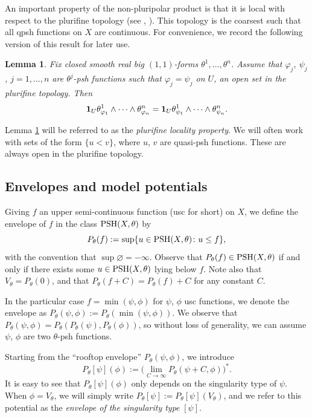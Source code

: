 \documentclass[11pt]{article}
\numberwithin{equation}{section}
\numberwithin{equation}{section}
\newtheorem{Lemma}[Theorem]{Lemma}
\theoremstyle{plain}
\newcommand{\id}{{\bf 1}}
\begin{document}
An important property of the non-pluripolar product is that it is local with respect to the plurifine topology (see \cite[Corollary~4.3]{BT87}, \cite[Section~1.2]{BEGZ10}).
This topology is the coarsest such that all qpsh functions on $X$ are continuous. For convenience, we record the following version of this result for later use.

\begin{Lemma} \label{lem: plurifine}
Fix closed smooth real big $(1,1)$-forms $\theta^1,\dots,\theta^n$. Assume that $\varphi_j$, $\psi_j$, $j=1,\dots,n$ are $\theta^j$-psh functions such that $\varphi_j =\psi_j$ on $U$, an open set in the plurifine topology. Then
\[
\id_{U} \theta^1_{\varphi_1} \wedge \dots \wedge \theta^n_{\varphi_n} = \id_{U} \theta^1_{\psi_1} \wedge\dots \wedge \theta^n_{\psi_n}.
\]
\end{Lemma}
Lemma \ref{lem: plurifine} will be referred to as the \emph{plurifine locality property}. We will often work with sets of the form $\{u<v\}$, where $u$, $v$ are quasi-psh functions. These are always open in the plurifine topology.

\subsection{Envelopes and model potentials}
Giving $f$ an upper semi-continuous function (usc for short) on $X$, we define the envelope of $f$ in the class ${\rm PSH}(X,\theta)$ by
\[
P_{\theta}(f) := \sup \{u\in {\rm PSH}(X,\theta) \colon u\leq f\},
\]
with the convention that $\sup\varnothing =-\infty$. Observe that $P_{\theta}(f)\in {\rm PSH}(X,\theta)$ if and only if there exists some $u\in {\rm PSH}(X,\theta)$ lying below $f$. Note also that $V_{\theta}=P_{\theta}(0)$, and that $P_{\theta}(f+C)= P_{\theta}(f)+C$ for any constant $C$.

 In the particular case $f=\min(\psi,\phi)$ for $\psi$, $\phi$ usc functions, we denote the envelope as
$ P_\theta(\psi,\phi):=P_\theta(\min(\psi,\phi))$.
We observe that $ P_\theta(\psi,\phi)= P_\theta(P_\theta(\psi),P_\theta(\phi))$, so without loss of generality, we can assume $\psi$, $\phi$ are two $\theta$-psh functions.

Starting from the ``rooftop envelope'' $ P_\theta(\psi,\phi)$, we introduce
\[P_\theta[\psi](\phi) := \big(\lim_{C \to \infty}P_\theta(\psi+C,\phi)\big)^*.\]
It is easy to see that $P_\theta[\psi](\phi)$ only depends on the singularity type of $\psi$. When $\phi = V_\theta$, we will simply write $P_\theta[\psi]:=P_\theta[\psi](V_\theta)$, and we refer to this potential as the \emph{envelope of the singularity type} $[\psi]$.
\end{document}
